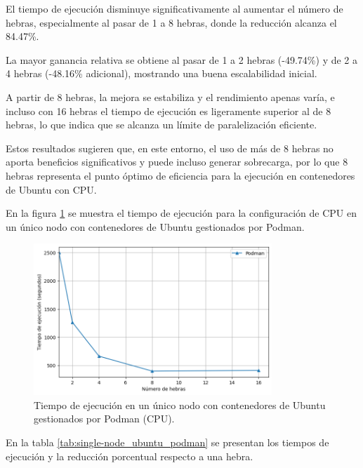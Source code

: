 El tiempo de ejecución disminuye significativamente al aumentar el número de hebras, especialmente al pasar de 1 a 8 hebras, donde la reducción alcanza el 84.47\%.

La mayor ganancia relativa se obtiene al pasar de 1 a 2 hebras (-49.74\%) y de 2 a 4 hebras (-48.16\% adicional), mostrando una buena escalabilidad inicial.

A partir de 8 hebras, la mejora se estabiliza y el rendimiento apenas varía, e incluso con 16 hebras el tiempo de ejecución es ligeramente superior al de 8 hebras, lo que indica que se alcanza un límite de paralelización eficiente.

Estos resultados sugieren que, en este entorno, el uso de más de 8 hebras no aporta beneficios significativos y puede incluso generar sobrecarga, por lo que 8 hebras representa el punto óptimo de eficiencia para la ejecución en contenedores de Ubuntu con CPU.

En la figura \ref{fig:single-node_ubuntu_podman_time} se muestra el tiempo de ejecución para la configuración de CPU en un único nodo con contenedores de Ubuntu gestionados por Podman.

\begin{figure}[H]
    \centering
    \includegraphics[width=0.8\textwidth]{imagenes/cap5/single-node_ubuntu_podman_time.png}
    \caption{Tiempo de ejecución en un único nodo con contenedores de Ubuntu gestionados por Podman (CPU).}
    \label{fig:single-node_ubuntu_podman_time}
\end{figure}

En la tabla \ref{tab:single-node_ubuntu_podman} se presentan los tiempos de ejecución y la reducción porcentual respecto a una hebra.

